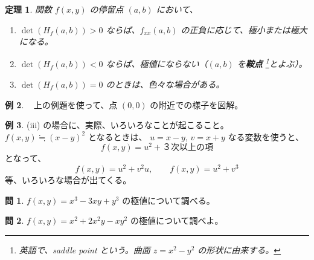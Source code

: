 \documentclass[a4paper]{jsarticle}
\newtheorem{Theorem}{定理}[section]
\theoremstyle{definition}
\newtheorem{Example}[Theorem]{例}
\newtheorem{Exercise}{問}%
\theoremstyle{remark}
\begin{document}
\begin{Theorem}
関数 $f(x,y)$ の停留点 $(a,b)$ において、
\begin{enumerate}
\item
$\det(H_f(a,b)) > 0$ ならば、$f_{xx}(a,b)$ の正負に応じて、極小または極大
になる。
\item
$\det(H_f(a,b)) < 0$ ならば、極値にならない（$(a,b)$ を\textbf{鞍点}
\footnote{英語で、saddle point という。曲面 $z = x^2 - y^2$ の形状に由来する。}とよぶ）。
\item
$\det(H_f(a,b)) = 0$ のときは、色々な場合がある。
\end{enumerate}
\end{Theorem}

\begin{Example}~
上の例題を使って、点 $(0,0)$ の附近での様子を図解。
\end{Example}

\begin{Example}
(iii) の場合に、実際、いろいろなことが起こること。
$f(x,y) \fallingdotseq (x-y)^2$ となるときは、
$u = x - y$, $v = x + y$ なる変数を使うと、
\[
f(x,y) = u^2 + \text{３次以上の項}
\]
となって、
\[
f(x,y) = u^2 + v^2u, \qquad 
f(x,y) = u^2 + v^3
\]
等、いろいろな場合が出てくる。
\end{Example}

\begin{Exercise}
$f(x,y) = x^3 -3xy + y^3$ の極値について調べる。
\end{Exercise}

\begin{Exercise}
$f(x,y) = x^2 + 2x^2y - xy^2$ の極値について調べよ。
\end{Exercise}
\end{document}
